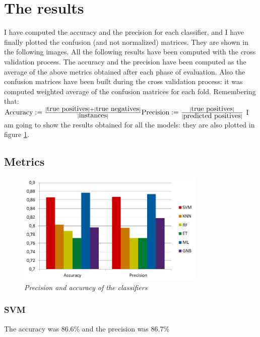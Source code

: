 \documentclass[12pt]{article}
\begin{document}
\section{The results}
\label{sec:results}
I have computed the accuracy and the precision for each classifier, and I have finally plotted the confusion (and not normalized) matrices. They are shown in the following images. All the following results have been computed with the cross validation process. The accuracy and the precision have been computed as the average of the above metrics obtained after each phase of evaluation. Also the confusion matrices have been built during the cross validation process: it was computed weighted average of the confusion matrices for each fold. Remembering that:
$
\newline\newline
\mbox{Accuracy}:= \frac{|\mbox{true positives}| + |\mbox{true negatives}|}{|\mbox{instances}|}
\newline\newline
\mbox{Precision}:= \frac{|\mbox{true positives}|}{|\mbox{predicted positives}|}
\newline\newline
$
I am going to show the results obtained for all the models: they are also plotted in figure \ref{fig:metrics}.
\subsection{Metrics}
\begin{figure}[!ht]
	\centering %
	\includegraphics[width=0.8\textwidth]{metrics.png} %
	\caption{\textit{Precision and accuracy of the classifiers}} %
	\label{fig:metrics}
\end{figure}
\subsubsection{SVM}
The accuracy was 86.6\% and the precision was 86.7\%
\end{document}
